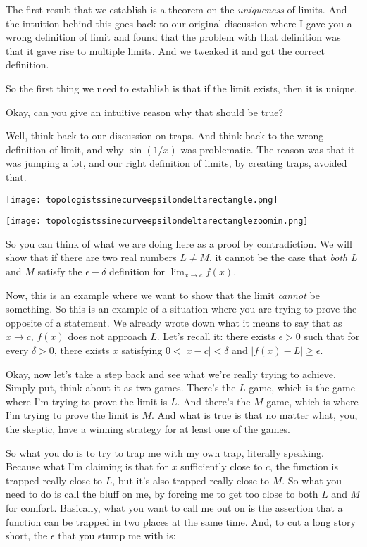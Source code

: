 \documentclass[10pt]{amsart}
\begin{document}
The first result that we establish is a theorem on the {\em
uniqueness} of limits. And the intuition behind this goes back to our
original discussion where I gave you a wrong definition of limit and
found that the problem with that definition was that it gave rise to
multiple limits. And we tweaked it and got the correct definition.

So the first thing we need to establish is that if the limit exists,
then it is unique.

Okay, can you give an intuitive reason why that should be true?

Well, think back to our discussion on traps. And think back to the
wrong definition of limit, and why $\sin(1/x)$ was problematic. The
reason was that it was jumping a lot, and our right definition of
limits, by creating traps, avoided that.  

\texttt{[image: topologistssinecurveepsilondeltarectangle.png]}

\texttt{[image: topologistssinecurveepsilondeltarectanglezoomin.png]}

So you can think of what we are doing here as a proof by
contradiction. We will show that if there are two real numbers $L \ne
M$, it cannot be the case that {\em both} $L$ and $M$ satisfy the
$\epsilon-\delta$ definition for $\lim_{x \to c} f(x)$.

Now, this is an example where we want to show that the limit {\em
cannot} be something. So this is an example of a situation where you
are trying to prove the opposite of a statement. We already wrote down
what it means to say that as $x \to c$, $f(x)$ does not approach
$L$. Let's recall it: there exists $\epsilon > 0$ such that for every
$\delta > 0$, there exists $x$ satisfying $0 < |x - c| < \delta$ and
$|f(x) - L| \ge \epsilon$.

Okay, now let's take a step back and see what we're really trying to
achieve. Simply put, think about it as two games. There's the
$L$-game, which is the game where I'm trying to prove the limit is
$L$. And there's the $M$-game, which is where I'm trying to prove the
limit is $M$. And what is true is that no matter what, you, the
skeptic, have a winning strategy for at least one of the games.

So what you do is to try to trap me with my own trap, literally
speaking. Because what I'm claiming is that for $x$ sufficiently close
to $c$, the function is trapped really close to $L$, but it's also
trapped really close to $M$. So what you need to do is call the bluff
on me, by forcing me to get too close to both $L$ and $M$ for
comfort. Basically, what you want to call me out on is the assertion
that a function can be trapped in two places at the same time. And, to
cut a long story short, the $\epsilon$ that you stump me with is:
\end{document}
